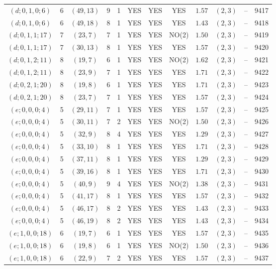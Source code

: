 \begin{longtable}{|c|c|c|c|c|c|c|c|c|c|c|c|}
$(d;0,1,0;6)$ & 6 & $(49,13)$ & 9 & 1 & YES & YES & YES & $1.57$ & $(2,3)$ & -- & 9417\\
$(d;0,1,0;6)$ & 6 & $(49,18)$ & 8 & 1 & YES & YES & YES & $1.43$ & $(2,3)$ & -- & 9418\\
$(d;0,1,1;17)$ & 7 & $(23,7)$ & 7 & 1 & YES & YES & NO(2) & $1.50$ & $(2,3)$ & -- & 9419\\
$(d;0,1,1;17)$ & 7 & $(30,13)$ & 8 & 1 & YES & YES & YES & $1.57$ & $(2,3)$ & -- & 9420\\
$(d;0,1,2;11)$ & 8 & $(19,7)$ & 6 & 1 & YES & YES & NO(2) & $1.62$ & $(2,3)$ & -- & 9421\\
$(d;0,1,2;11)$ & 8 & $(23,9)$ & 7 & 1 & YES & YES & YES & $1.71$ & $(2,3)$ & -- & 9422\\
$(d;0,2,1;20)$ & 8 & $(19,8)$ & 6 & 1 & YES & YES & YES & $1.71$ & $(2,3)$ & -- & 9423\\
$(d;0,2,1;20)$ & 8 & $(23,7)$ & 7 & 1 & YES & YES & YES & $1.57$ & $(2,3)$ & -- & 9424\\
$(e;0,0,0;4)$ & 5 & $(29,11)$ & 7 & 1 & YES & YES & YES & $1.57$ & $(2,3)$ & -- & 9425\\
$(e;0,0,0;4)$ & 5 & $(30,11)$ & 7 & 2 & YES & YES & NO(2) & $1.50$ & $(2,3)$ & -- & 9426\\
$(e;0,0,0;4)$ & 5 & $(32,9)$ & 8 & 4 & YES & YES & YES & $1.29$ & $(2,3)$ & -- & 9427\\
$(e;0,0,0;4)$ & 5 & $(33,10)$ & 8 & 1 & YES & YES & YES & $1.71$ & $(2,3)$ & -- & 9428\\
$(e;0,0,0;4)$ & 5 & $(37,11)$ & 8 & 1 & YES & YES & YES & $1.29$ & $(2,3)$ & -- & 9429\\
$(e;0,0,0;4)$ & 5 & $(39,16)$ & 8 & 1 & YES & YES & YES & $1.71$ & $(2,3)$ & -- & 9430\\
$(e;0,0,0;4)$ & 5 & $(40,9)$ & 9 & 4 & YES & YES & NO(2) & $1.38$ & $(2,3)$ & -- & 9431\\
$(e;0,0,0;4)$ & 5 & $(41,17)$ & 8 & 1 & YES & YES & YES & $1.57$ & $(2,3)$ & -- & 9432\\
$(e;0,0,0;4)$ & 5 & $(46,17)$ & 8 & 2 & YES & YES & YES & $1.43$ & $(2,3)$ & -- & 9433\\
$(e;0,0,0;4)$ & 5 & $(46,19)$ & 8 & 2 & YES & YES & YES & $1.43$ & $(2,3)$ & -- & 9434\\
$(e;1,0,0;18)$ & 6 & $(19,7)$ & 6 & 1 & YES & YES & YES & $1.57$ & $(2,3)$ & -- & 9435\\
$(e;1,0,0;18)$ & 6 & $(19,8)$ & 6 & 1 & YES & YES & NO(2) & $1.50$ & $(2,3)$ & -- & 9436\\
$(e;1,0,0;18)$ & 6 & $(22,9)$ & 7 & 2 & YES & YES & YES & $1.57$ & $(2,3)$ & -- & 9437\\

\end{longtable}
